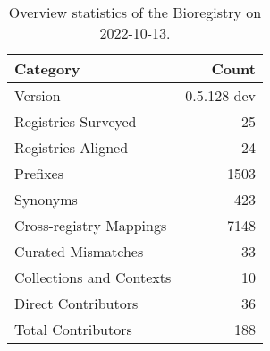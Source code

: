 \begin{table}
\centering
\caption{Overview statistics of the Bioregistry on 2022-10-13.}
\label{tab:bioregistry-summary}
\begin{tabular}{lr}
\toprule
                Category &       Count \\
\midrule
                 Version & 0.5.128-dev \\
     Registries Surveyed &          25 \\
      Registries Aligned &          24 \\
                Prefixes &        1503 \\
                Synonyms &         423 \\
 Cross-registry Mappings &        7148 \\
      Curated Mismatches &          33 \\
Collections and Contexts &          10 \\
     Direct Contributors &          36 \\
      Total Contributors &         188 \\
\bottomrule
\end{tabular}
\end{table}
